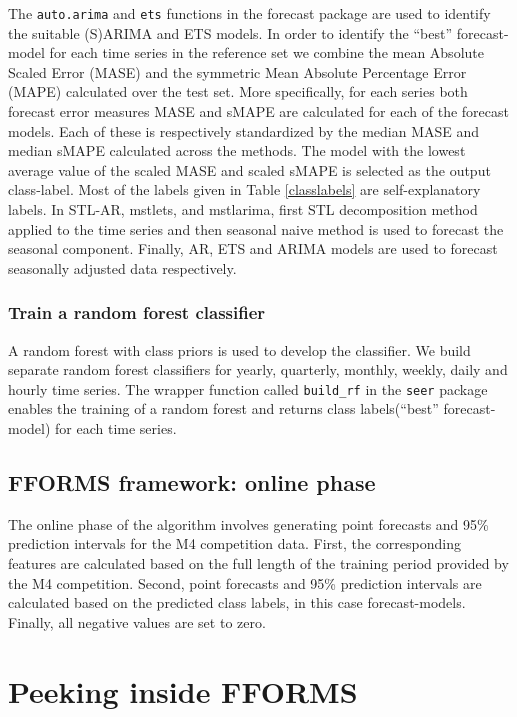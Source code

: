 \documentclass[11pt,a4paper,]{article}
\theoremstyle{definition}
\theoremstyle{definition}
\theoremstyle{definition}
\theoremstyle{remark}
\begin{document}
The \texttt{auto.arima} and \texttt{ets} functions in the forecast
package are used to identify the suitable (S)ARIMA and ETS models. In
order to identify the ``best'' forecast-model for each time series in
the reference set we combine the mean Absolute Scaled Error (MASE) and
the symmetric Mean Absolute Percentage Error (MAPE) calculated over the
test set. More specifically, for each series both forecast error
measures MASE and sMAPE are calculated for each of the forecast models.
Each of these is respectively standardized by the median MASE and median
sMAPE calculated across the methods. The model with the lowest average
value of the scaled MASE and scaled sMAPE is selected as the output
class-label. Most of the labels given in Table \ref{classlabels} are
self-explanatory labels. In STL-AR, mstlets, and mstlarima, first STL
decomposition method applied to the time series and then seasonal naive
method is used to forecast the seasonal component. Finally, AR, ETS and
ARIMA models are used to forecast seasonally adjusted data respectively.

\subsubsection{Train a random forest
classifier}\label{train-a-random-forest-classifier}

A random forest with class priors is used to develop the classifier. We
build separate random forest classifiers for yearly, quarterly, monthly,
weekly, daily and hourly time series. The wrapper function called
\texttt{build\_rf} in the \texttt{seer} package enables the training of
a random forest and returns class labels(``best'' forecast-model) for
each time series.

\subsection{FFORMS framework: online
phase}\label{fforms-framework-online-phase}

The online phase of the algorithm involves generating point forecasts
and 95\% prediction intervals for the M4 competition data. First, the
corresponding features are calculated based on the full length of the
training period provided by the M4 competition. Second, point forecasts
and 95\% prediction intervals are calculated based on the predicted
class labels, in this case forecast-models. Finally, all negative values
are set to zero.

\section{Peeking inside FFORMS}\label{machinelearning}
\end{document}
